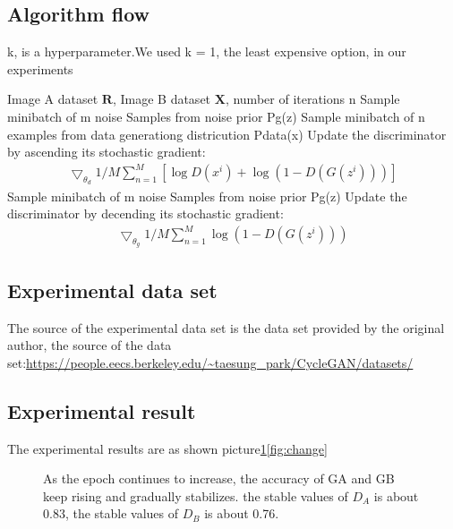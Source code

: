 \documentclass[10pt,twocolumn,letterpaper]{article}
\begin{document}
\subsection{Algorithm flow}

\begin{algorithm}
	\caption{k, is a hyperparameter.We used k = 1, the least expensive option, in our experiments}
    \label{alg}
	\begin{algorithmic}[1]
	\REQUIRE  Image A dataset  $\mathbf{R}$,  Image B dataset  $\mathbf{X}$, number of iterations n 
      \STATE{}
      \STATE Sample minibatch of m noise Samples from noise prior Pg(z)
      \STATE Sample minibatch of n examples from data generationg districution Pdata(x)
      \STATE Update the discriminator by ascending its stochastic gradient:
      \STATE \begin{align}
        \bigtriangledown_{\theta_{d}} 1/M \sum_{n=1}^M [\log D(x^{i}) + \log (1-D(G(z^{i})))]
      \end{align}
      \STATE\ENDFOR
      \STATE Sample minibatch of m noise Samples from noise prior Pg(z)
      \STATE Update the discriminator by decending its stochastic gradient:
      \STATE \begin{align}
        \bigtriangledown_{\theta_{g}} 1/M \sum_{n=1}^M \log (1-D(G(z^{i})))
      \end{align}
    \ENDFOR
	\end{algorithmic}
\end{algorithm}


\subsection{ Experimental data set}
The source of the experimental data set is the data set provided by the original author, 
the source of the data set:\url{https://people.eecs.berkeley.edu/~taesung_park/CycleGAN/datasets/}

\subsection{Experimental result}
The experimental results are as shown picture\ref{fig:loss200_02}\ref{fig:change}

\begin{figure}
  \centering
  \caption{
  As the epoch continues to increase,
  the accuracy of GA and GB 
  keep rising and gradually stabilizes.
  the stable values of $D_A$ is about 0.83,
  the stable values of $D_B$ is about 0.76.}
  \label{fig:loss200_02}
\end{figure}
\end{document}
